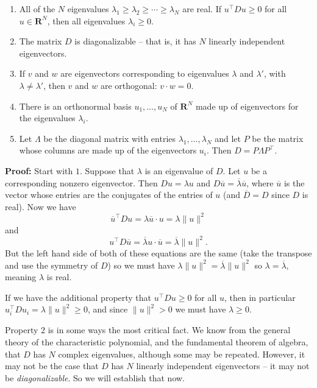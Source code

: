 \documentclass[
]{article}
\providecommand{\tightlist}{%
  \setlength{\itemsep}{0pt}\setlength{\parskip}{0pt}}
\begin{document}
\begin{enumerate}
\def\labelenumi{\arabic{enumi}.}
\tightlist
\item
  All of the \(N\) eigenvalues
  \(\lambda_1\ge \lambda_2\ge \cdots \ge \lambda_{N}\) are real. If
  \(u^{\intercal}Du\ge 0\) for all \(u\in\mathbf{R}^{N}\), then all
  eigenvalues \(\lambda_{i}\ge 0\).
\item
  The matrix \(D\) is diagonalizable -- that is, it has \(N\) linearly
  independent eigenvectors.
\item
  If \(v\) and \(w\) are eigenvectors corresponding to eigenvalues
  \(\lambda\) and \(\lambda'\), with \(\lambda\not=\lambda'\), then
  \(v\) and \(w\) are orthogonal: \(v\cdot w=0\).
\item
  There is an orthonormal basis \(u_{1},\ldots, u_{N}\) of
  \(\mathbf{R}^{N}\) made up of eigenvectors for the eigenvalues
  \(\lambda_{i}\).
\item
  Let \(\Lambda\) be the diagonal matrix with entries
  \(\lambda_{1},\ldots, \lambda_{N}\) and let \(P\) be the matrix whose
  columns are made up of the eigenvectors \(u_{i}\). Then
  \(D=P\Lambda P^{\intercal}\).
\end{enumerate}

\textbf{Proof:} Start with \(1\). Suppose that \(\lambda\) is an
eigenvalue of \(D\). Let \(u\) be a corresponding nonzero eigenvector.
Then \(Du=\lambda u\) and
\(D\overline{u}=\overline{\lambda}\overline{u}\), where \(\overline{u}\)
is the vector whose entries are the conjugates of the entries of \(u\)
(and \(\overline{D}=D\) since \(D\) is real). Now we have \[
\overline{u}^{\intercal}Du = \lambda \overline{u}\cdot u = \lambda\|u\|^2
\] and \[
u^{\intercal}D\overline{u} = \overline{\lambda}u\cdot \overline{u} = \overline{\lambda}\|u\|^2.
\] But the left hand side of both of these equations are the same (take
the transpose and use the symmetry of \(D\)) so we must have
\(\lambda\|u\|^2 = \overline{\lambda}\|u\|^2\) so
\(\lambda=\overline{\lambda}\), meaning \(\lambda\) is real.

If we have the additional property that \(u^{\intercal}Du\ge 0\) for all
\(u\), then in particular
\(u_{i}^{\intercal}Du_{i} = \lambda\|u\|^2\ge 0\), and since
\(\|u\|^2> 0\) we must have \(\lambda\ge 0\).

Property \(2\) is in some ways the most critical fact. We know from the
general theory of the characteristic polynomial, and the fundamental
theorem of algebra, that \(D\) has \(N\) complex eigenvalues, although
some may be repeated. However, it may not be the case that \(D\) has
\(N\) linearly independent eigenvectors -- it may not be
\emph{diagonalizable}. So we will establish that now.
\end{document}
